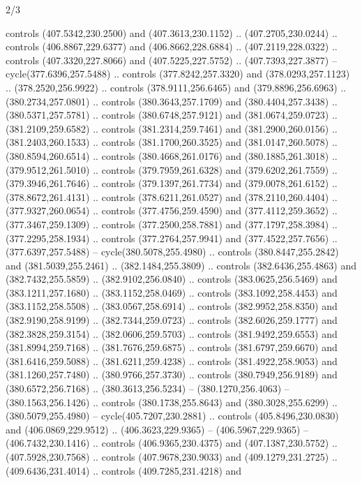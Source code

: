 \begin{flagdescription}{2/3}
\begin{scope}[xshift=0.5\flaglength,yshift=0.5\flagwidth,scale=\flagwidth/495.65]
\begin{scope}[y=0.8pt, x=0.8pt, yscale=-1,shift={(-463.76,-309.78)}]
  controls (407.5342,230.2500) and (407.3613,230.1152) .. (407.2705,230.0244) ..
  controls (406.8867,229.6377) and (406.8662,228.6884) .. (407.2119,228.0322) ..
  controls (407.3320,227.8066) and (407.5225,227.5752) .. (407.7393,227.3877) --
  cycle(377.6396,257.5488) .. controls (377.8242,257.3320) and
  (378.0293,257.1123) .. (378.2520,256.9922) .. controls (378.9111,256.6465) and
  (379.8896,256.6963) .. (380.2734,257.0801) .. controls (380.3643,257.1709) and
  (380.4404,257.3438) .. (380.5371,257.5781) .. controls (380.6748,257.9121) and
  (381.0674,259.0723) .. (381.2109,259.6582) .. controls (381.2314,259.7461) and
  (381.2900,260.0156) .. (381.2403,260.1533) .. controls (381.1700,260.3525) and
  (381.0147,260.5078) .. (380.8594,260.6514) .. controls (380.4668,261.0176) and
  (380.1885,261.3018) .. (379.9512,261.5010) .. controls (379.7959,261.6328) and
  (379.6202,261.7559) .. (379.3946,261.7646) .. controls (379.1397,261.7734) and
  (379.0078,261.6152) .. (378.8672,261.4131) .. controls (378.6211,261.0527) and
  (378.2110,260.4404) .. (377.9327,260.0654) .. controls (377.4756,259.4590) and
  (377.4112,259.3652) .. (377.3467,259.1309) .. controls (377.2500,258.7881) and
  (377.1797,258.3984) .. (377.2295,258.1934) .. controls (377.2764,257.9941) and
  (377.4522,257.7656) .. (377.6397,257.5488) -- cycle(380.5078,255.4980) ..
  controls (380.8447,255.2842) and (381.5039,255.2461) .. (382.1484,255.3809) ..
  controls (382.6436,255.4863) and (382.7432,255.5859) .. (382.9102,256.0840) ..
  controls (383.0625,256.5469) and (383.1211,257.1680) .. (383.1152,258.0469) ..
  controls (383.1092,258.4453) and (383.1152,258.5508) .. (383.0567,258.6914) ..
  controls (382.9952,258.8350) and (382.9190,258.9199) .. (382.7344,259.0723) ..
  controls (382.6026,259.1777) and (382.3828,259.3154) .. (382.0606,259.5703) ..
  controls (381.9492,259.6553) and (381.8994,259.7168) .. (381.7676,259.6875) ..
  controls (381.6797,259.6670) and (381.6416,259.5088) .. (381.6211,259.4238) ..
  controls (381.4922,258.9053) and (381.1260,257.7480) .. (380.9766,257.3730) ..
  controls (380.7949,256.9189) and (380.6572,256.7168) .. (380.3613,256.5234) --
  (380.1270,256.4063) -- (380.1563,256.1426) .. controls (380.1738,255.8643) and
  (380.3028,255.6299) .. (380.5079,255.4980) -- cycle(405.7207,230.2881) ..
  controls (405.8496,230.0830) and (406.0869,229.9512) .. (406.3623,229.9365) --
  (406.5967,229.9365) -- (406.7432,230.1416) .. controls (406.9365,230.4375) and
  (407.1387,230.5752) .. (407.5928,230.7568) .. controls (407.9678,230.9033) and
  (409.1279,231.2725) .. (409.6436,231.4014) .. controls (409.7285,231.4218) and

\end{scope}
\end{scope}
\end{flagdescription}
